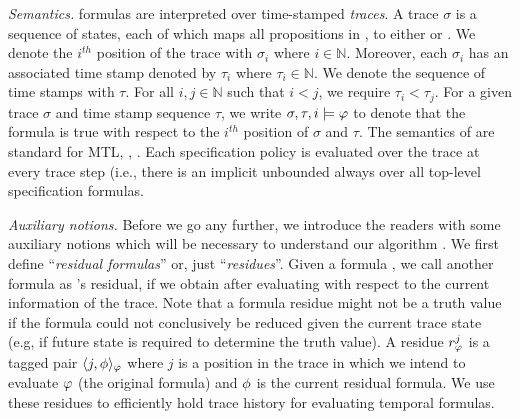 \textit{Semantics. }
\planguage formulas are interpreted over time-stamped \emph{traces}. A trace $\sigma$ is a sequence of states, each of which maps all propositions in \sfmap, to either \true or \false. We denote the $i^{th}$ position of the trace with $\sigma_i$ where $i\in\mathbb{N}$. Moreover, each $\sigma_i$ has an associated time stamp denoted by $\tau_i$ where $\tau_i\in\mathbb{N}$. 
We denote the sequence of time stamps with $\tau$. For all $i, j\in\mathbb{N}$ such that $i < j$, we require $\tau_i < \tau_j$. For a given trace $\sigma$ and time stamp sequence $\tau$, we write $\sigma, \tau, i\models\varphi$ to denote that the formula \policy is true with respect to the $i^{th}$ position of $\sigma$ and $\tau$. 
The semantics of \planguage are standard for MTL, \eg, \cite{Basin2008}. Each specification policy is evaluated over the trace at every trace step (i.e., there is an implicit unbounded always over all top-level specification formulas.

\textit{Auxiliary notions.} 
Before we go any further, we introduce the readers with some auxiliary notions which will be 
necessary to understand our algorithm \monitor. We first define ``\emph{residual formulas}'' or, just ``\emph{residues}''. 
Given a formula \policy, we call another formula \policyv as \policy's residual, if we obtain \policyv after evaluating \policy with respect to the current information of the trace. 
Note that a formula residue might not be a truth value if the formula could not conclusively be reduced given the current trace state (e.g, if future state is required to determine the truth value). 
A residue $r^j_{\varphi}$ is a tagged pair $\langle j, \phi \rangle_{\varphi}$ where $j$ is a position in the trace in which we intend to evaluate $\varphi$ (the original formula) and $\phi$ is the current residual formula. We use these residues to efficiently hold trace history for evaluating temporal formulas.

